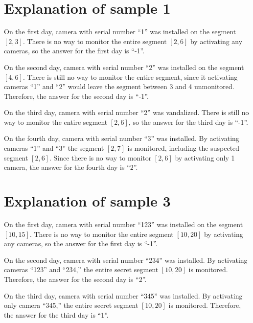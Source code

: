 \section*{Explanation of sample 1}
On the first day, camera with serial number ``1'' was installed on the segment $[2,3]$.
There is no way to monitor the entire segment $[2,6]$ by activating any cameras, so the answer for the first day is ``-1''.

On the second day, camera with serial number ``2'' was installed on the segment $[4,6]$.
There is still no way to monitor the entire segment, since it activating cameras ``1'' and ``2'' would leave the segment between 3 and 4 unmonitored.
Therefore, the answer for the second day is ``-1''.

On the third day, camera with serial number ``2'' was vandalized.
There is still no way to monitor the entire segment $[2,6]$, so the answer for the third day is ``-1''.

On the fourth day, camera with serial number ``3'' was installed.
By activating cameras ``1'' and ``3'' the segment $[2,7]$ is monitored, including the suspected segment $[2,6]$.
Since there is no way to monitor $[2,6]$ by activating only 1 camera, the answer for the fourth day is ``2''.


\section*{Explanation of sample 3}
On the first day, camera with serial number ``123'' was installed on the segment $[10,15]$.
There is no way to monitor the entire segment $[10,20]$ by activating any cameras, so the answer for the first day is ``-1''.

On the second day, camera with serial number ``234'' was installed.
By activating cameras ``123'' and ``234,'' the entire secret segment $[10,20]$ is monitored.
Therefore, the answer for the second day is ``2''.

On the third day, camera with serial number ``345'' was installed.
By activating only camera ``345,'' the entire secret segment $[10,20]$ is monitored.
Therefore, the answer for the third day is ``1''.
